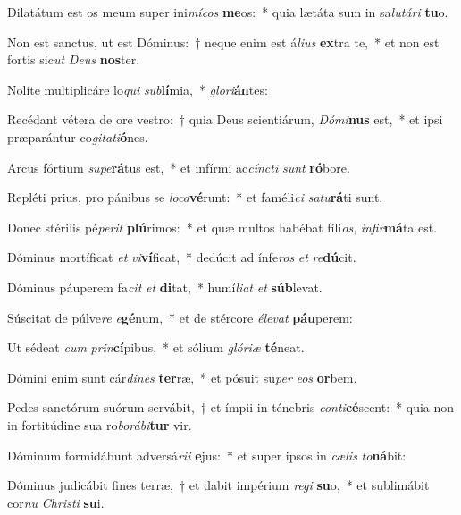 \item Dilatátum est os meum super ini\textit{mí}\textit{cos} \textbf{me}os:~* quia lætáta sum in sa\textit{lu}\textit{tá}\textit{ri} \textbf{tu}o.
\item Non est sanctus, ut est Dóminus:~† neque enim est á\textit{li}\textit{us} \textbf{ex}tra te,~* et non est fortis sic\textit{ut} \textit{De}\textit{us} \textbf{nos}ter.
\item Nolíte multiplicáre lo\textit{qui} \textit{sub}\textbf{lí}mia,~* \textit{glo}\textit{ri}\textbf{án}tes:
\item Recédant vétera de ore vestro:~† quia Deus scientiárum, \textit{Dó}\textit{mi}\textbf{nus} est,~* et ipsi præparántur co\textit{gi}\textit{ta}\textit{ti}\textbf{ó}nes.
\item Arcus fórtium \textit{su}\textit{pe}\textbf{rá}tus est,~* et infírmi ac\textit{cínc}\textit{ti} \textit{sunt} \textbf{ró}bore.
\item Repléti prius, pro pánibus se \textit{lo}\textit{ca}\textbf{vé}runt:~* et faméli\textit{ci} \textit{sa}\textit{tu}\textbf{rá}ti sunt.
\item Donec stérilis pé\textit{pe}\textit{rit} \textbf{plú}rimos:~* et quæ multos habébat fíli\textit{os}, \textit{in}\textit{fir}\textbf{má}ta est.
\item Dóminus mortíficat \textit{et} \textit{vi}\textbf{ví}ficat,~* dedúcit ad ínfe\textit{ros} \textit{et} \textit{re}\textbf{dú}cit.
\item Dóminus páuperem fa\textit{cit} \textit{et} \textbf{di}tat,~* humí\textit{li}\textit{at} \textit{et} \textbf{súb}levat.
\item Súscitat de púlve\textit{re} \textit{e}\textbf{gé}num,~* et de stércore \textit{é}\textit{le}\textit{vat} \textbf{páu}perem:
\item Ut sédeat \textit{cum} \textit{prin}\textbf{cí}pibus,~* et sólium \textit{gló}\textit{ri}\textit{æ} \textbf{té}neat.
\item Dómini enim sunt cár\textit{di}\textit{nes} \textbf{ter}ræ,~* et pósuit su\textit{per} \textit{e}\textit{os} \textbf{or}bem.
\item Pedes sanctórum suórum servábit,~† et ímpii in ténebris \textit{con}\textit{ti}\textbf{cé}scent:~* quia non in fortitúdine sua ro\textit{bo}\textit{rá}\textit{bi}\textbf{tur} vir.
\item Dóminum formidábunt adversá\textit{ri}\textit{i} \textbf{e}jus:~* et super ipsos in \textit{cæ}\textit{lis} \textit{to}\textbf{ná}bit:
\item Dóminus judicábit fines terræ,~† et dabit impérium \textit{re}\textit{gi} \textbf{su}o,~* et sublimábit cor\textit{nu} \textit{Chris}\textit{ti} \textbf{su}i.
